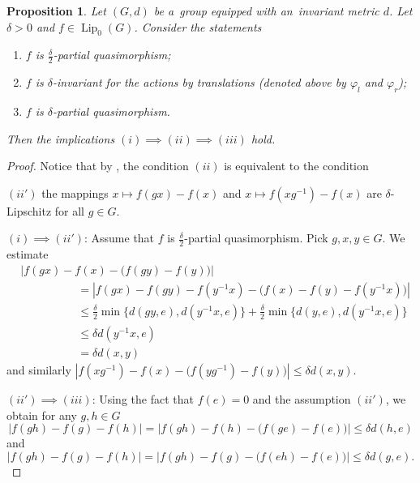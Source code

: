 \documentclass[11pt,a4paper]{amsart}
\newtheorem{proposition}[theorem]{Proposition}
\theoremstyle{definition}
\newcommand{\abs}[1]{\left| #1 \right|}
\newcommand{\Lipz}{\operatorname{Lip}_0}
\begin{document}
	\begin{proposition} \label{prop:InvVsPQM}
		Let $(G, d)$ be a~group equipped with an~invariant metric $d$. Let $\delta > 0$ and $f \in \Lipz(G)$. Consider the statements
		\begin{enumerate}
			\item $f$ is $\frac{\delta}{2}$-partial quasimorphism;
			\item $f$ is $\delta$-invariant for the actions by translations (denoted above by $\varphi_l$ and $\varphi_r$);
			\item $f$ is $\delta$-partial quasimorphism.
		\end{enumerate}
		Then the implications $(i) \implies (ii) \implies (iii)$ hold.
	\end{proposition}
	\begin{proof}
		Notice that by , the condition $(ii)$ is equivalent to the condition
		\begin{center}
			$(ii')$ the mappings $x \mapsto f(gx) - f(x)$ and $x \mapsto f(xg^{-1}) - f(x)$ are $\delta$-Lipschitz for all $g \in G$.
		\end{center}
		
		$(i) \implies (ii')$: Assume that $f$ is $\frac{\delta}{2}$-partial quasimorphism. Pick $g, x, y \in G$. We estimate
		\begin{align*}
			&\abs{f(gx) - f(x) - \big(f(gy) - f(y)\big)}\\
			&\hspace{5em}= \abs{f(gx) - f(gy) - f(y^{-1}x) - \big(f(x) - f(y) - f(y^{-1}x)\big)}\\
			&\hspace{5em}\leq \frac{\delta}{2} \min \{d(gy, e), d(y^{-1}x, e)\} + \frac{\delta}{2} \min\{d(y, e), d(y^{-1}x, e)\}\\
			&\hspace{5em}\leq \delta d(y^{-1}x, e)\\
			&\hspace{5em}= \delta d(x, y)
		\end{align*}
		and similarly $\abs{f(xg^{-1}) - f(x) - \big(f(yg^{-1}) - f(y)\big)} \leq \delta d(x, y)$.
		
		$(ii') \implies (iii)$:
		Using the fact that $f(e) = 0$ and the assumption $(ii')$, we obtain for any $g, h \in G$
		\begin{equation*}
			\abs{f(gh) - f(g) - f(h)}
			= \abs{f(gh) - f(h) - \big(f(ge) - f(e)\big)}
			\leq \delta d(h, e)
		\end{equation*}
		and
		\begin{equation*}
			\abs{f(gh) - f(g) - f(h)}
			= \abs{f(gh) - f(g) - \big(f(eh) - f(e)\big)}
			\leq \delta d(g, e).
		\end{equation*}
	\end{proof}
	
\end{document}
